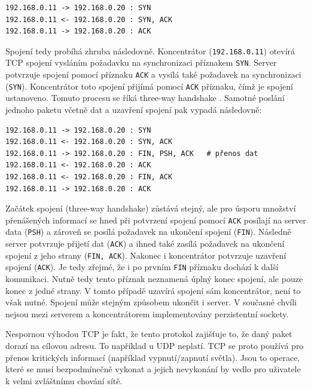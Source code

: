 \begin{verbatim}
192.168.0.11 -> 192.168.0.20 : SYN
192.168.0.11 <- 192.168.0.20 : SYN, ACK
192.168.0.11 -> 192.168.0.20 : ACK
\end{verbatim}

Spojení tedy probíhá zhruba následovně. Koncentrátor (\texttt{192.168.0.11}) otevírá TCP spojení vysláním požadavku na synchronizaci příznakem \texttt{SYN}. Server potvrzuje spojení pomocí příznaku \texttt{ACK} a vysílá také požadavek na synchronizaci (\texttt{SYN}). Koncentrátor toto spojení přijímá pomocí \texttt{ACK} příznaku, čímž je spojení ustanoveno. Tomuto procesu se říká three-way handshake \cite{mistrovstvi}. Samotné poslání jednoho paketu včetně dat a uzavření spojení pak vypadá následovně:

\begin{verbatim}
192.168.0.11 -> 192.168.0.20 : SYN
192.168.0.11 <- 192.168.0.20 : SYN, ACK
192.168.0.11 -> 192.168.0.20 : FIN, PSH, ACK   # přenos dat
192.168.0.11 <- 192.168.0.20 : ACK
192.168.0.11 <- 192.168.0.20 : FIN, ACK
192.168.0.11 -> 192.168.0.20 : ACK
\end{verbatim}

Začátek spojení (three-way handshake) zůstává stejný, ale pro úsporu množství přenášených informací se hned při potvrzení spojení pomocí \texttt{ACK} posílají na server data (\texttt{PSH}) a zároveň se posílá požadavek na ukončení spojení (\texttt{FIN}). Následně server potvrzuje přijetí dat (\texttt{ACK}) a ihned také zasílá požadavek na ukončení spojení z jeho strany (\texttt{FIN, ACK}). Nakonec i koncentrátor potvrzuje uzavření spojení (\texttt{ACK}). Je tedy zřejmé, že i po prvním \texttt{FIN} příznaku dochází k další komunikaci. Nutně tedy tento příznak neznamená úplný konec spojení, ale pouze konec z jedné strany. V tomto případě uzavírá spojení sám koncentrátor, není to však nutné. Spojení může stejným způsobem ukončit i server. V současné chvíli nejsou mezi serverem a koncentrátorem implementovány perzistentní sockety.

Nespornou výhodou TCP je fakt, že tento protokol zajišťuje to, že daný paket dorazí na cílovou adresu. To například u UDP neplatí. TCP se proto používá pro přenos kritických informací (například vypnutí/zapnutí světla). Jsou to operace, které se musí bezpodmínečně vykonat a jejich nevykonání by vedlo pro uživatele k velmi zvláštnímu chování sítě.

